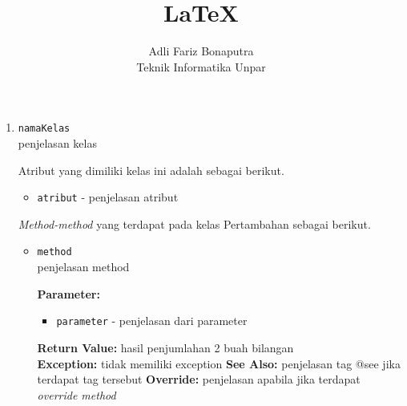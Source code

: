 \documentclass{article}
\title{\LaTeX}
\author{Adli Fariz Bonaputra \\ Teknik Informatika Unpar}
\begin{document}
\maketitle

\begin{enumerate}
	\item \texttt{namaKelas}\\
	{penjelasan kelas}
	
	Atribut yang dimiliki kelas ini adalah sebagai berikut.
	\begin{itemize}
		\item \texttt{atribut} -
		{penjelasan atribut}
	\end{itemize}
	
	{\it Method-method} yang terdapat pada kelas Pertambahan sebagai berikut.
	\begin{itemize}
		\item \texttt{method}\\
		{penjelasan method}
		
		\textbf{Parameter:}
		\begin{itemize}
			\item \texttt{parameter} - 
			{penjelasan dari parameter}
		\end{itemize}
		
		\textbf{Return Value:} {hasil penjumlahan 2 buah bilangan}\\
		\textbf{Exception:} {tidak memiliki exception}
		\textbf{See Also:} {penjelasan tag @see jika terdapat tag tersebut}
		\textbf{Override:} {penjelasan apabila jika terdapat \textit{override method}}
	\end{itemize}
\end{enumerate}
\end{document}
